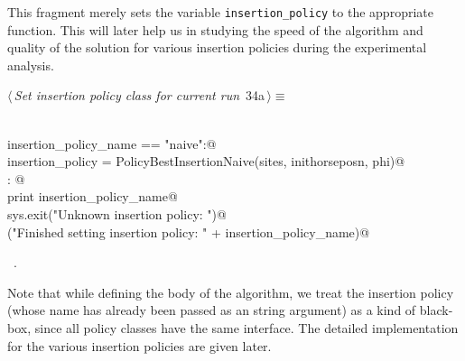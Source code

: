 \documentclass[11.5pt]{report}
\begin{document}
\vspace{-0.8cm}\newchunk This fragment merely sets the variable \verb|insertion_policy| to 
the appropriate function. This will later help us in studying the speed of 
the algorithm and quality of the solution for various insertion policies 
during the experimental analysis. 

\begin{flushleft} \small\label{scrap27}\raggedright\small
{} $\langle\,${\itshape Set insertion policy class for current run}\nobreak\ {\footnotesize {34a}}$\,\rangle\equiv$
\vspace{-1ex}
\begin{list}{}{} \item
\mbox{}\verb@@\\
\mbox{}\verb@if insertion_policy_name == "naive":@\\
\mbox{}\verb@     insertion_policy = PolicyBestInsertionNaive(sites, inithorseposn, phi)@\\
\mbox{}\verb@else: @\\
\mbox{}\verb@     print insertion_policy_name@\\
\mbox{}\verb@     sys.exit("Unknown insertion policy: ")@\\
\mbox{}\verb@debug("Finished setting insertion policy: " + insertion_policy_name)@\\
\mbox{}\verb@@{\NWsep}
\end{list}
\vspace{-1.5ex}
\footnotesize
\begin{list}{}{\setlength{\itemsep}{-\parsep}\setlength{\itemindent}{-\leftmargin}}
\item \NWtxtMacroRefIn\ .

\item{}
\end{list}
\vspace{4ex}
\end{flushleft}
\vspace{-0.8cm}\newchunk Note that while defining the body of the algorithm, we treat the insertion policy 
(whose name has already been passed as an string argument) as a kind of black-box, since all 
policy classes have the same interface. The detailed implementation for the various 
insertion policies are given later. 
\end{document}
